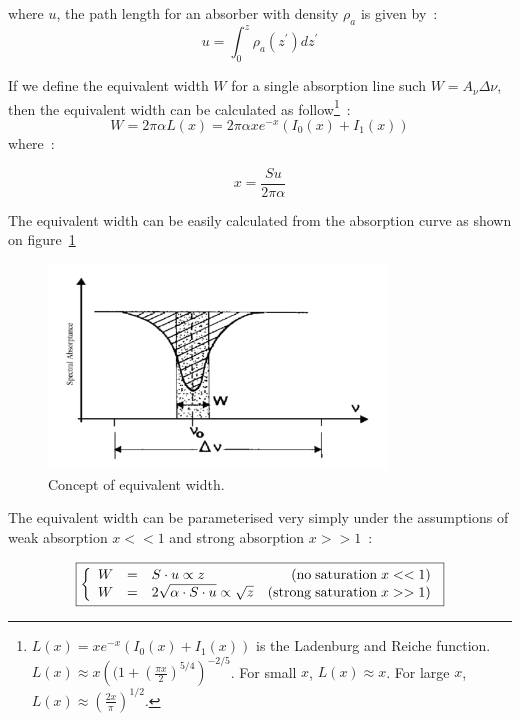 \documentclass[a4paper]{article}
\begin{document}
{where $u$, the path length for an absorber with density $\rho_a$ is given by~:
\begin{equation}
u = \int_0^z \rho_a(z^\prime)dz^\prime
\end{equation}

If we define the equivalent width $W$ for a single absorption line such $W=A_\nu \Delta \nu$, then the equivalent width can be calculated as follow\footnote{$L(x)= x e^{-x}(I_0(x)+I_1(x)) $ is the Ladenburg and Reiche function. $L(x)\approx x\left( (1+(\frac{\pi x}{2})^{5/4}\right)^{-2/5}$. For small $x$, $L(x)\approx x$. For large $x$, $L(x)\approx \left( \frac{2x}{\pi}\right)^{1/2}$.}~:
\begin{equation}
W = 2\pi \alpha L(x)=2\pi \alpha x e^{-x}(I_0(x)+I_1(x))
\end{equation}
where~:

\begin{equation}
 x=\frac{Su}{2\pi\alpha}
\end{equation}

The equivalent width can be easily calculated from the absorption curve as shown on figure~\ref{fig:ew}

\begin{figure}
\centering
\includegraphics[width=0.8\textwidth]{images/ew}
\caption{\label{fig:ew}Concept of equivalent width.}
\end{figure}


The equivalent width can be parameterised very simply under the assumptions of weak absorption $ x<<1$ and strong absorption $x>>1$~:

\begin{equation}
\fbox{$
\left\{
\begin{array}{ccl r}
W & = & S\cdot u  \propto z  & ({\rm no \; saturation\; }x<<1)\\
W & = & 2\sqrt{\alpha \cdot S\cdot u}  \propto \sqrt{z}  & ({\rm strong\;saturation\;} x>>1)\\
\end{array}
\right.
$}
\label{eq:ew}
\end{equation}

}
\end{document}
